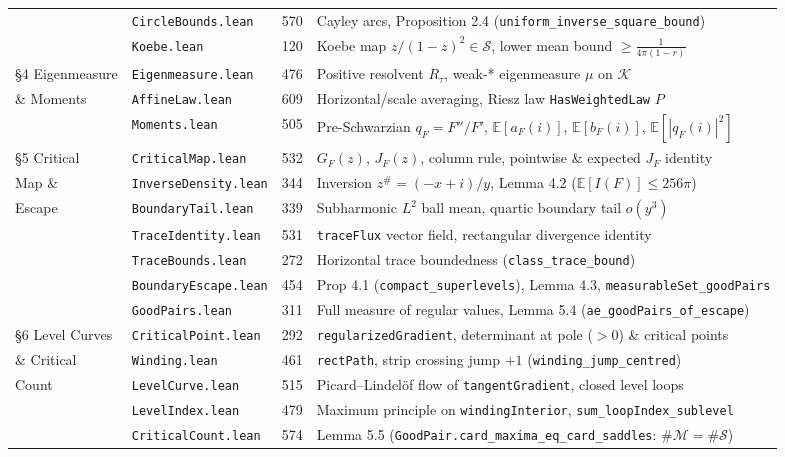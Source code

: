 \documentclass[11pt,reqno]{amsart}
\theoremstyle{definition}
\newcommand{\Kclass}{\mathcal{K}}
\newcommand{\Sclass}{\mathcal{S}}
\newcommand{\E}{\mathbb{E}}
\begin{document}
\begin{longtable}{@{}llrl@{}}
 & \texttt{CircleBounds.lean} & 570 & Cayley arcs, Proposition 2.4 (\texttt{uniform\_inverse\_square\_bound}) \\
 & \texttt{Koebe.lean} & 120 & Koebe map $z/(1-z)^2 \in \Sclass$, lower mean bound $\ge \frac{1}{4\pi(1-r)}$ \\
\midrule
\S4 Eigenmeasure & \texttt{Eigenmeasure.lean} & 476 & Positive resolvent $R_\tau$, weak-* eigenmeasure $\mu$ on $\Kclass$ \\
\quad \& Moments & \texttt{AffineLaw.lean} & 609 & Horizontal/scale averaging, Riesz law \texttt{HasWeightedLaw} $P$ \\
 & \texttt{Moments.lean} & 505 & Pre-Schwarzian $q_F = F''/F'$, $\E[a_F(i)]$, $\E[b_F(i)]$, $\E[|q_F(i)|^2]$ \\
\midrule
\S5 Critical & \texttt{CriticalMap.lean} & 532 & $G_F(z)$, $J_F(z)$, column rule, pointwise \& expected $J_F$ identity \\
\quad Map \& & \texttt{InverseDensity.lean} & 344 & Inversion $z^\# = (-x+i)/y$, Lemma 4.2 ($\E[I(F)] \le 256\pi$) \\
\quad Escape & \texttt{BoundaryTail.lean} & 339 & Subharmonic $L^2$ ball mean, quartic boundary tail $o(y^3)$ \\
 & \texttt{TraceIdentity.lean} & 531 & \texttt{traceFlux} vector field, rectangular divergence identity \\
 & \texttt{TraceBounds.lean} & 272 & Horizontal trace boundedness (\texttt{class\_trace\_bound}) \\
 & \texttt{BoundaryEscape.lean} & 454 & Prop 4.1 (\texttt{compact\_superlevels}), Lemma 4.3, \texttt{measurableSet\_goodPairs} \\
 & \texttt{GoodPairs.lean} & 311 & Full measure of regular values, Lemma 5.4 (\texttt{ae\_goodPairs\_of\_escape}) \\
\midrule
\S6 Level Curves & \texttt{CriticalPoint.lean} & 292 & \texttt{regularizedGradient}, determinant at pole ($>0$) \& critical points \\
\quad \& Critical & \texttt{Winding.lean} & 461 & \texttt{rectPath}, strip crossing jump $+1$ (\texttt{winding\_jump\_centred}) \\
\quad Count & \texttt{LevelCurve.lean} & 515 & Picard--Lindel\"of flow of \texttt{tangentGradient}, closed level loops \\
 & \texttt{LevelIndex.lean} & 479 & Maximum principle on \texttt{windingInterior}, \texttt{sum\_loopIndex\_sublevel} \\
 & \texttt{CriticalCount.lean} & 574 & Lemma 5.5 (\texttt{GoodPair.card\_maxima\_eq\_card\_saddles}: $\#\mathcal{M}=\#\mathcal{S}$) \\

\end{longtable}
\end{document}

